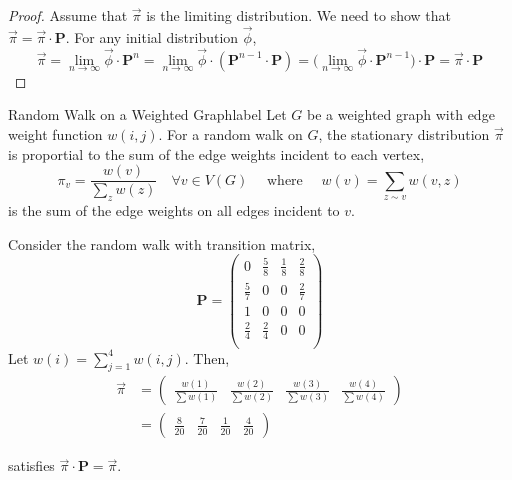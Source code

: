 \documentclass{tufte-handout}
\begin{document}
  \begin{proof}
    Assume that $\Vec{\pi}$ is the limiting distribution. We need to show that $\Vec{\pi} = \Vec{\pi} \cdot \boldsymbol{P}$. For any initial distribution $\Vec{\phi}$,
    \[
    \Vec{\pi} = \lim\limits_{n\rightarrow\infty} \Vec{\phi} \cdot \boldsymbol{P}^n = \lim\limits_{n\rightarrow\infty} \Vec{\phi} \cdot (\boldsymbol{P}^{n-1} \cdot \boldsymbol{P}) = \big(\lim\limits_{n\rightarrow\infty} \Vec{\phi} \cdot \boldsymbol{P}^{n-1}\big) \cdot \boldsymbol{P} = \Vec{\pi} \cdot \boldsymbol{P}
    \]
  \end{proof}

  \begin{ex}{Random Walk on a Weighted Graph}{label}
    Let $G$ be a weighted graph with edge weight function $w(i,j)$. For a random walk on $G$, the stationary distribution $\Vec{\pi}$ is proportial to the sum of the edge weights incident to each vertex,
    \[\pi_{v}=\frac{w(v)}{\sum_{z} w(z)} \quad \forall v \in V(G) \quad \text{ where } \quad w(v)=\sum_{z \sim v} w(v, z)\]
    \noindent is the sum of the edge weights on all edges incident to $v$.

    \vphantom{.}

    Consider the random walk with transition matrix,
    \[
    \boldsymbol{P} = \begin{pmatrix}
    0 &  \frac{5}{8} & \frac{1}{8} & \frac{2}{8} \\
    \frac{5}{7} &  0 & 0 & \frac{2}{7}\\
    1 &  0 & 0 & 0\\
    \frac{2}{4} & \frac{2}{4} & 0 & 0\\
    \end{pmatrix}
    \]
    \noindent Let $w(i) = \sum_{j = 1}^4 w(i,j)$. Then,
    \begin{align*}
      \Vec{\pi} &= \begin{pmatrix} \frac{w(1)}{\sum w(1)} & \frac{w(2)}{\sum w(2)} & \frac{w(3)}{\sum w(3)} & \frac{w(4)}{\sum w(4)} \end{pmatrix} \\
      &= \begin{pmatrix} \frac{8}{20} & \frac{7}{20} & \frac{1}{20} & \frac{4}{20} \end{pmatrix}
    \end{align*}

    \noindent satisfies $\Vec{\pi} \cdot \boldsymbol{P} = \Vec{\pi}$.
  \end{ex}
\end{document}
